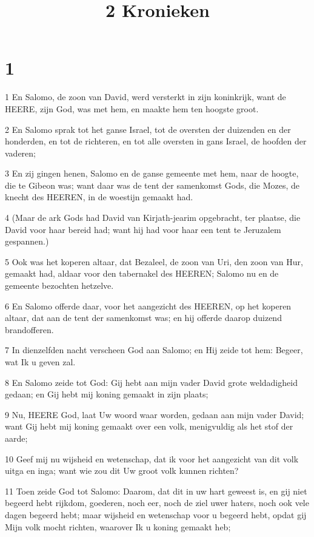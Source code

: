 

\title{2 Kronieken}



\chapter{1}

\par 1 En Salomo, de zoon van David, werd versterkt in zijn koninkrijk, want de HEERE, zijn God, was met hem, en maakte hem ten hoogste groot.
\par 2 En Salomo sprak tot het ganse Israel, tot de oversten der duizenden en der honderden, en tot de richteren, en tot alle oversten in gans Israel, de hoofden der vaderen;
\par 3 En zij gingen henen, Salomo en de ganse gemeente met hem, naar de hoogte, die te Gibeon was; want daar was de tent der samenkomst Gods, die Mozes, de knecht des HEEREN, in de woestijn gemaakt had.
\par 4 (Maar de ark Gods had David van Kirjath-jearim opgebracht, ter plaatse, die David voor haar bereid had; want hij had voor haar een tent te Jeruzalem gespannen.)
\par 5 Ook was het koperen altaar, dat Bezaleel, de zoon van Uri, den zoon van Hur, gemaakt had, aldaar voor den tabernakel des HEEREN; Salomo nu en de gemeente bezochten hetzelve.
\par 6 En Salomo offerde daar, voor het aangezicht des HEEREN, op het koperen altaar, dat aan de tent der samenkomst was; en hij offerde daarop duizend brandofferen.
\par 7 In dienzelfden nacht verscheen God aan Salomo; en Hij zeide tot hem: Begeer, wat Ik u geven zal.
\par 8 En Salomo zeide tot God: Gij hebt aan mijn vader David grote weldadigheid gedaan; en Gij hebt mij koning gemaakt in zijn plaats;
\par 9 Nu, HEERE God, laat Uw woord waar worden, gedaan aan mijn vader David; want Gij hebt mij koning gemaakt over een volk, menigvuldig als het stof der aarde;
\par 10 Geef mij nu wijsheid en wetenschap, dat ik voor het aangezicht van dit volk uitga en inga; want wie zou dit Uw groot volk kunnen richten?
\par 11 Toen zeide God tot Salomo: Daarom, dat dit in uw hart geweest is, en gij niet begeerd hebt rijkdom, goederen, noch eer, noch de ziel uwer haters, noch ook vele dagen begeerd hebt; maar wijsheid en wetenschap voor u begeerd hebt, opdat gij Mijn volk mocht richten, waarover Ik u koning gemaakt heb;
